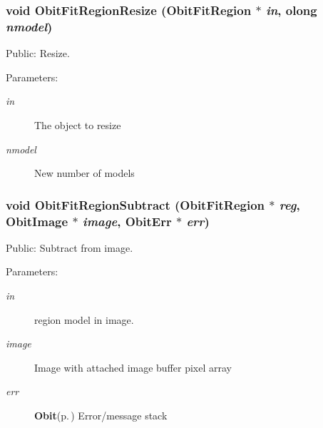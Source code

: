 \subsubsection{\setlength{\rightskip}{0pt plus 5cm}void Obit\-Fit\-Region\-Resize ({\bf Obit\-Fit\-Region} $\ast$ {\em in}, {\bf olong} {\em nmodel})}\label{ObitFitRegion_8c_a10}


Public: Resize. 

\begin{Desc}
\item[Parameters:]
\begin{description}
\item[{\em in}]The object to resize \item[{\em nmodel}]New number of models \end{description}
\end{Desc}
\subsubsection{\setlength{\rightskip}{0pt plus 5cm}void Obit\-Fit\-Region\-Subtract ({\bf Obit\-Fit\-Region} $\ast$ {\em reg}, {\bf Obit\-Image} $\ast$ {\em image}, {\bf Obit\-Err} $\ast$ {\em err})}\label{ObitFitRegion_8c_a13}


Public: Subtract from image. 

\begin{Desc}
\item[Parameters:]
\begin{description}
\item[{\em in}]region model in image. \item[{\em image}]Image with attached image buffer pixel array \item[{\em err}]{\bf Obit}{\rm (p.\,\pageref{structObit})} Error/message stack \end{description}
\end{Desc}
